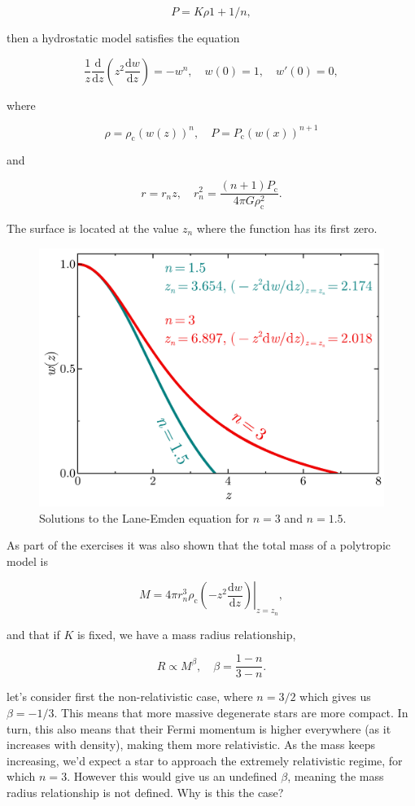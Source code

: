 \documentclass[twocolumn]{article}
\begin{document}
\[P=K\rho{1+1/n},\]

then a hydrostatic model satisfies the equation

\[\frac{1}{z}\frac{\mathrm{d}}{\mathrm{d}z}\left(z^2\frac{\mathrm{d}w}{\mathrm{d}z}\right) = -w^n,\quad w(0)=1,\quad w'(0)=0,\]

where

\[\rho = \rho_\mathrm{c} (w(z))^n,\quad P=P_\mathrm{c}(w(x))^{n+1}\]

and

\[r = r_nz,\quad r_n^2 = \frac{(n+1)P_\mathrm{c}}{4\pi G \rho_\mathrm{c}^2}.\]

The surface is located at the value \(z_n\) where the function has its
first zero.

\begin{figure}
\centering
\includegraphics{../assets/4_eos2/polytrope.pdf}
\caption{Solutions to the Lane-Emden equation for $n=3$ and $n=1.5$.}
\end{figure}

As part of the exercises it was also shown that the total mass of a
polytropic model is

\[M=4\pi r_n^3 \rho_\mathrm{c}\left.\left(-z^2\frac{\mathrm{d}w}{\mathrm{d}z}\right)\right|_{z=z_n},\tag{3.4}\]

and that if \(K\) is fixed, we have a mass radius relationship,

\[R\propto M^\beta,\quad \beta=\frac{1-n}{3-n}.\]

let's consider first the non-relativistic case, where \(n=3/2\) which
gives us \(\beta=-1/3\). This means that more massive degenerate stars
are more compact. In turn, this also means that their Fermi momentum is
higher everywhere (as it increases with density), making them more
relativistic. As the mass keeps increasing, we'd expect a star to
approach the extremely relativistic regime, for which \(n=3\). However
this would give us an undefined \(\beta\), meaning the mass radius
relationship is not defined. Why is this the case?
\end{document}
